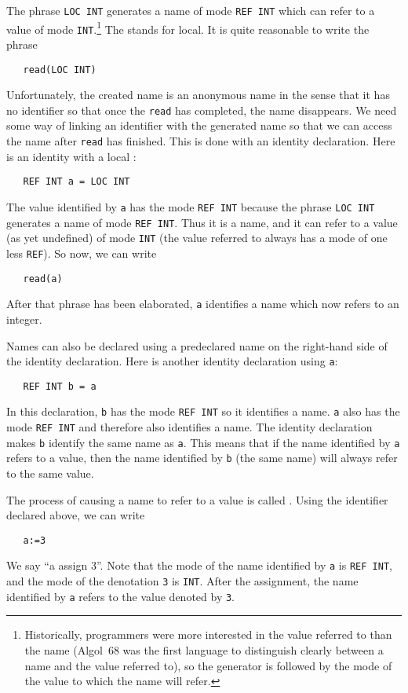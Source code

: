 The phrase \verb|LOC INT| generates a name of mode \verb|REF INT|
which can refer to a value of mode \verb|INT|.\footnote{Historically,
programmers were more interested in the value referred to than the
name (Algol~68 was the first language to distinguish clearly between
a name and the value referred to), so the generator is followed by
the mode of the value to which the name will refer.} The 
stands for local. It is quite reasonable to write the phrase
\begin{verbatim}
   read(LOC INT)
\end{verbatim}
\noindent
Unfortunately, the created name is an anonymous name in the sense
that it has no identifier so that once the \verb|read| has completed,
the name disappears. We need some way of linking an identifier with
the generated name so that we can access the name after \verb|read|
has finished. This is done with an identity declaration. Here is an
identity  with
a local :
\begin{verbatim}
   REF INT a = LOC INT
\end{verbatim}
\noindent
The value identified by \verb|a| has the mode \verb|REF INT| because
the phrase \verb|LOC INT| generates a name of mode \verb|REF INT|. Thus
it is a name, and it can refer to a value (as yet undefined) of mode
\verb|INT| (the value referred to always has a mode of one less
\verb|REF|). So now, we can write
\begin{verbatim}
   read(a)
\end{verbatim}
\noindent
After that phrase has been elaborated, \verb|a| identifies a name which
now refers to an integer.

Names can also be declared using a predeclared name on the right-hand
side of the identity declaration. Here is another identity declaration
using \verb|a|:
\begin{verbatim}
   REF INT b = a
\end{verbatim}
\noindent
In this declaration, \verb|b| has the mode \verb|REF INT| so it
identifies a name. \verb|a| also has the mode \verb|REF INT| and
therefore also identifies a name. The identity declaration makes
\verb|b| identify the same name as \verb|a|. This means that if the
name identified by \verb|a| refers to a value, then the name identified
by \verb|b| (the same name) will always refer to the same value.

The process of causing a name to refer to a value is called
. Using the identifier declared above, we
can write
\begin{verbatim}
   a:=3
\end{verbatim}
\noindent
We say ``a assign 3''.  Note that the mode of the name identified by
\verb|a| is \verb|REF INT|, and the mode of the denotation \verb|3|
is \verb|INT|.  After the assignment, the name identified by \verb|a|
refers to the value denoted by \verb|3|.

